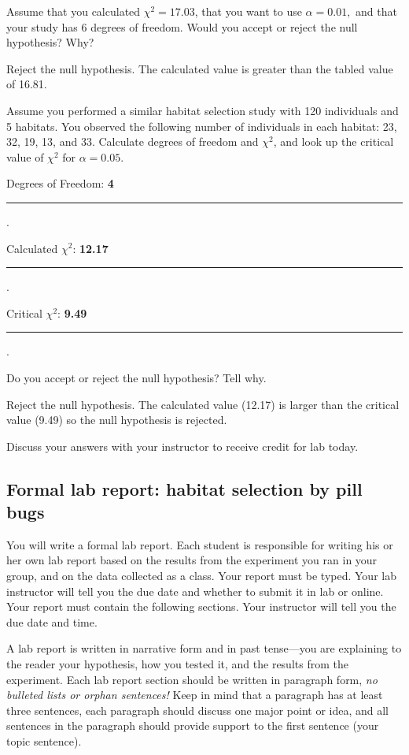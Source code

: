 \documentclass[12pt, hidelinks]{exam}
\newcommand*\AnswerBox[2]{%
    \parbox[t][#1]{0.92\textwidth}{%
    \begin{solution}#2\end{solution}}
    \vspace{\stretch{1}}
}
\newlength{\basespace}
\newcommand\chisq{$\chi^2$}
\newcommand*\AnswerBlank[1]{%
	\ifprintanswers%
		\textbf{#1}
	\else%
		\rule{0.75in}{0.4pt}\kern0.67pt.\fi%
	}
\begin{document}
\begin{questions}
	\question
	Assume that you calculated $\chi^2 = 17.03$, that you want to use $\alpha = 0.01,$ and that your study has 6 degrees of freedom. Would you accept or reject the null hypothesis? Why?

	\AnswerBox{2\basespace}{Reject the null hypothesis. The calculated value is greater than the tabled value of 16.81.}

	\question[Checkout]
	Assume you performed a similar habitat selection study with 120 individuals and 5 habitats. You observed the following number of individuals in each habitat: 23, 32, 19, 13, and 33. Calculate degrees of freedom and \chisq{}, and look up the critical value of \chisq{} for $\alpha = 0.05$.\bigskip
	
	Degrees of Freedom: \AnswerBlank{4} \bigskip 
	
	Calculated \chisq{}: \AnswerBlank{12.17} \bigskip
	
	Critical \chisq{}: \AnswerBlank{9.49}
	
	\question[Checkout]
	Do you accept or reject the null hypothesis?  Tell why.
	
	\AnswerBox{\basespace}{%
		Reject the null hypothesis. The calculated value (12.17) is larger than the critical value (9.49) so the null hypothesis is rejected.
	}
		
	Discuss your answers with your instructor to receive credit for lab today.
	
\end{questions}
	

\subsection*{Formal lab report: habitat selection by pill bugs}

You will write a formal lab report. Each student is responsible for writing his or her own lab report based on
the results from the experiment you ran in your group, and on the data collected as a
class. Your report must be typed. Your lab instructor will tell you the due date and whether to submit it in lab or online. Your report must contain the following sections. Your instructor will tell you the due date and time.
 
A lab report is written in narrative form and in past tense—you are
explaining to the reader your hypothesis, how you tested it, and the
results from the experiment. Each lab report section should be written
in paragraph form, \emph{no bulleted lists or orphan sentences!} Keep in
mind that a paragraph has at least three sentences, each paragraph should
discuss one major point or idea, and all sentences in the paragraph
should provide support to the first sentence (your topic sentence).
\end{document}
